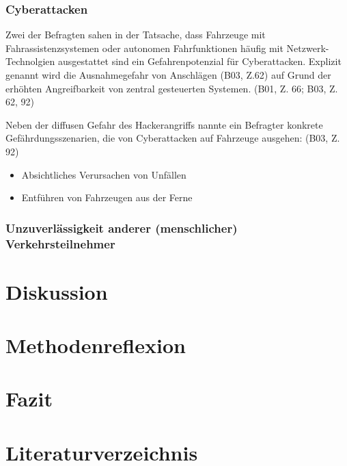 \documentclass[12pt]{article}
\newcommand\fakesection[1]{%
    \markboth{#1}{#1}}
\begin{document}
\subsubsection*{Cyberattacken}
Zwei der Befragten sahen in der Tatsache, dass Fahrzeuge mit Fahrassistenzsystemen oder autonomen Fahrfunktionen häufig mit Netzwerk-Technolgien ausgestattet sind ein Gefahrenpotenzial für Cyberattacken. Explizit genannt wird die \glqq Ausnahmegefahr von Anschlägen\grqq{} (B03, Z.62) auf Grund der erhöhten Angreifbarkeit von zentral gesteuerten Systemen. (B01, Z. 66; B03, Z. 62, 92)

Neben der diffusen Gefahr des Hackerangriffs nannte ein Befragter konkrete Gefährdungsszenarien, die von Cyberattacken auf Fahrzeuge ausgehen: (B03, Z. 92)
\begin{itemize}
    \item Absichtliches Verursachen von Unfällen
    \item Entführen von Fahrzeugen aus der Ferne
\end{itemize}

\subsubsection*{Unzuverlässigkeit anderer (menschlicher) Verkehrsteilnehmer}



\clearpage
\section{Diskussion}

\clearpage
\section{Methodenreflexion}

\clearpage
\section{Fazit}

\clearpage
{}

\clearpage
\appendix
\pagestyle{appendix}

\label{att:Anhang1}
\fakesection{Anhang1}
% 

\section{Literaturverzeichnis}
\pagestyle{MRstyle}
\setcounter{biburllcpenalty}{7000}
\setcounter{biburlucpenalty}{8000}
\printbibliography
\pagebreak

\pagestyle{plain}
%
\end{document}

